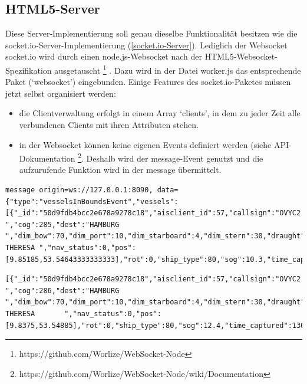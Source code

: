 \subsection{HTML5-Server}\label{HTML5-Server}
Diese Server-Implementierung soll genau dieselbe Funktionalität besitzen wie die socket.io-Server-Implementierung (\ref{socket.io-Server}). Lediglich der Websocket socket.io wird durch einen node.js-Websocket nach der HTML5-Websocket-Spezifikation ausgetauscht \footnote{\label{foot:2}https://github.com/Worlize/WebSocket-Node} . Dazu wird in der Datei worker.js das entsprechende Paket (‘websocket’) eingebunden.
Einige Features des socket.io-Paketes müssen jetzt selbst organisiert werden: 
\begin{itemize}
\item die Clientverwaltung erfolgt in einem Array ‘clients’, in dem zu jeder Zeit alle verbundenen Clients mit ihren Attributen stehen. 
\item in der Websocket können keine eigenen Events definiert werden (siehe API-Dokumentation \footnote{\label{foot:2}https://github.com/Worlize/WebSocket-Node/wiki/Documentation}. Deshalb wird der message-Event genutzt und die aufzurufende Funktion wird in der message übermittelt.
\end{itemize}
\begin{lstlisting}[caption= vom Websocket-Server gesendete message, label=websocket-message]
message origin=ws://127.0.0.1:8090, data={"type":"vesselsInBoundsEvent","vessels":[{"_id":"50d9fdb4bcc2e678a9278c18","aisclient_id":57,"callsign":"OVYC2 ","cog":285,"dest":"HAMBURG ","dim_bow":70,"dim_port":10,"dim_starboard":4,"dim_stern":30,"draught":54,"imo":"9363170","mmsi":220515000,"msgid":1,"name":"RIKKE THERESA ","nav_status":0,"pos":[9.85185,53.54643333333333],"rot":0,"ship_type":80,"sog":10.3,"time_captured":1366733896000,"time_received":1366733855248,"true_heading":286}]}

\end{lstlisting}
\begin{lstlisting}[caption= vom socket.io-Server gesendete message, label=socket.io-message]
[{"_id":"50d9fdb4bcc2e678a9278c18","aisclient_id":57,"callsign":"OVYC2  ","cog":286,"dest":"HAMBURG             ","dim_bow":70,"dim_port":10,"dim_starboard":4,"dim_stern":30,"draught":54,"imo":"9363170","mmsi":220515000,"msgid":1,"name":"RIKKE THERESA       ","nav_status":0,"pos":[9.8375,53.54885],"rot":0,"ship_type":80,"sog":12.4,"time_captured":1366734056000,"time_received":1366734014715,"true_heading":288}]
\end{lstlisting}

